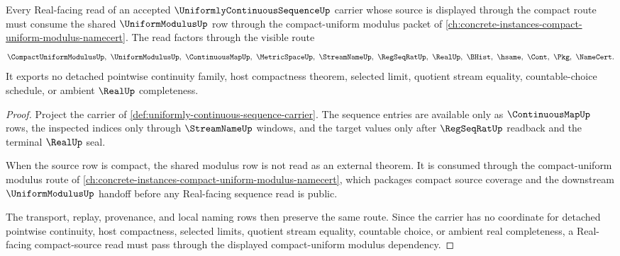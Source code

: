 \begin{theorem}
\label{thm:uniformly-continuous-sequence-compact-uniform-modulus-forward-route}
Every Real-facing read of an accepted $\UniformlyContinuousSequenceUp$ carrier whose source is displayed through the compact route must consume the shared $\UniformModulusUp$ row through the compact-uniform modulus packet of \autoref{ch:concrete-instances-compact-uniform-modulus-namecert}. The read factors through the visible route
$$
\CompactUniformModulusUp,\ \UniformModulusUp,\ \ContinuousMapUp,\ \MetricSpaceUp,\ \StreamNameUp,\ \RegSeqRatUp,\ \RealUp,\ \BHist,\ \hsame,\ \Cont,\ \Pkg,\ \NameCert .
$$
It exports no detached pointwise continuity family, host compactness theorem, selected limit, quotient stream equality, countable-choice schedule, or ambient $\RealUp$ completeness.
\end{theorem}
\begin{proof}
Project the carrier of \autoref{def:uniformly-continuous-sequence-carrier}. The sequence entries are available only as $\ContinuousMapUp$ rows, the inspected indices only through $\StreamNameUp$ windows, and the target values only after $\RegSeqRatUp$ readback and the terminal $\RealUp$ seal.

When the source row is compact, the shared modulus row is not read as an external theorem. It is consumed through the compact-uniform modulus route of \autoref{ch:concrete-instances-compact-uniform-modulus-namecert}, which packages compact source coverage and the downstream $\UniformModulusUp$ handoff before any Real-facing sequence read is public.

The transport, replay, provenance, and local naming rows then preserve the same route. Since the carrier has no coordinate for detached pointwise continuity, host compactness, selected limits, quotient stream equality, countable choice, or ambient real completeness, a Real-facing compact-source read must pass through the displayed compact-uniform modulus dependency.
\end{proof}
